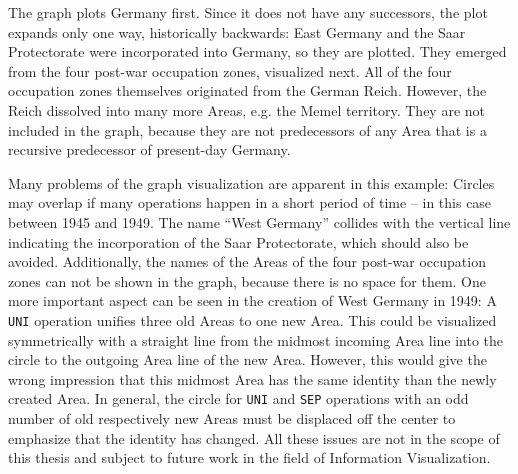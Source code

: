 The graph plots Germany first. Since it does not have any successors, the plot expands only one way, historically backwards: East Germany and the Saar Protectorate were incorporated into Germany, so they are plotted. They emerged from the four post-war occupation zones, visualized next. All of the four occupation zones themselves originated from the German Reich. However, the Reich dissolved into many more Areas, e.g. the Memel territory. They are not included in the graph, because they are not predecessors of any Area that is a recursive predecessor of present-day Germany.

Many problems of the graph visualization are apparent in this example: Circles may overlap if many operations happen in a short period of time -- in this case between 1945 and 1949.
The name ``West Germany'' collides with the vertical line indicating the incorporation of the Saar Protectorate, which should also be avoided.
Additionally, the names of the Areas of the four post-war occupation zones can not be shown in the graph, because there is no space for them.
One more important aspect can be seen in the creation of West Germany in 1949: A \texttt{UNI} operation unifies three old Areas to one new Area. This could be visualized symmetrically with a straight line from the midmost incoming Area line into the circle to the outgoing Area line of the new Area. However, this would give the wrong impression that this midmost Area has the same identity than the newly created Area. In general, the circle for \texttt{UNI} and \texttt{SEP} operations with an odd number of old respectively new Areas must be displaced off the center to emphasize that the identity has changed.
All these issues are not in the scope of this thesis and subject to future work in the field of Information Visualization.


